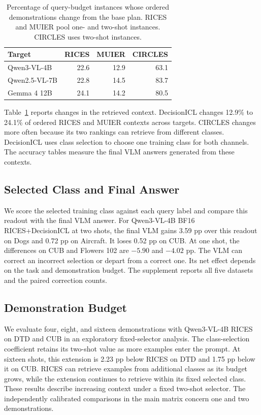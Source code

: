 \documentclass[10pt,twocolumn,letterpaper]{article}
\begin{document}
\begin{table}[t]
\caption{Percentage of query-budget instances whose ordered demonstrations change from the base plan. RICES and MUIER pool one- and two-shot instances. CIRCLES uses two-shot instances.}
\label{tab:changes}
\centering\small
\setlength{\tabcolsep}{7pt}
\begin{tabular}{lrrr}
\toprule
Target & RICES & MUIER & CIRCLES \\
\midrule
Qwen3-VL-4B & 22.6 & 12.9 & 63.1 \\
Qwen2.5-VL-7B & 22.8 & 14.5 & 83.7 \\
Gemma 4 12B & 24.1 & 14.2 & 80.5 \\
\bottomrule
\end{tabular}
\end{table}

Table~\ref{tab:changes} reports changes in the retrieved context. DecisionICL changes 12.9\% to 24.1\% of ordered RICES and MUIER contexts across targets. CIRCLES changes more often because its two rankings can retrieve from different classes. DecisionICL uses class selection to choose one training class for both channels. The accuracy tables measure the final VLM answers generated from these contexts.

\subsection{Selected Class and Final Answer}
\label{sec:readout}
We score the selected training class against each query label and compare this readout with the final VLM answer. For Qwen3-VL-4B BF16 RICES+DecisionICL at two shots, the final VLM gains 3.59 pp over this readout on Dogs and 0.72 pp on Aircraft. It loses 0.52 pp on CUB. At one shot, the differences on CUB and Flowers 102 are $-5.90$ and $-4.02$ pp. The VLM can correct an incorrect selection or depart from a correct one. Its net effect depends on the task and demonstration budget. The supplement reports all five datasets and the paired correction counts.

\subsection{Demonstration Budget}
\label{sec:analysis}
We evaluate four, eight, and sixteen demonstrations with Qwen3-VL-4B RICES on DTD and CUB in an exploratory fixed-selector analysis. The class-selection coefficient retains its two-shot value as more examples enter the prompt. At sixteen shots, this extension is 2.23 pp below RICES on DTD and 1.75 pp below it on CUB. RICES can retrieve examples from additional classes as its budget grows, while the extension continues to retrieve within its fixed selected class. These results describe increasing context under a fixed two-shot selector. The independently calibrated comparisons in the main matrix concern one and two demonstrations.
\end{document}
